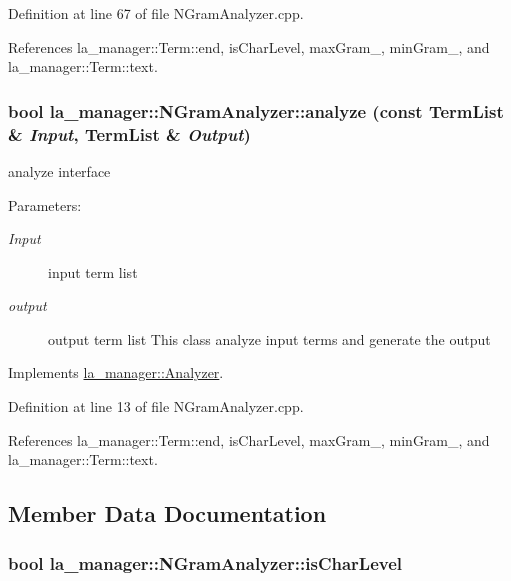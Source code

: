 Definition at line 67 of file NGramAnalyzer.cpp.

References la\_\-manager::Term::end, isCharLevel, maxGram\_\-, minGram\_\-, and la\_\-manager::Term::text.\hypertarget{classla__manager_1_1NGramAnalyzer_09bdd966dba6ac9b3ef4858fd0b24699}{
\subsubsection[{analyze}]{\setlength{\rightskip}{0pt plus 5cm}bool la\_\-manager::NGramAnalyzer::analyze (const {\bf TermList} \& {\em Input}, \/  {\bf TermList} \& {\em Output})}}
\label{classla__manager_1_1NGramAnalyzer_09bdd966dba6ac9b3ef4858fd0b24699}


analyze interface 

\begin{Desc}
\item[Parameters:]
\begin{description}
\item[{\em Input}]input term list \item[{\em output}]output term list This class analyze input terms and generate the output \end{description}
\end{Desc}


Implements \hyperlink{classla__manager_1_1Analyzer_a096ba4b2faeaa0f3938d7b826ab1c78}{la\_\-manager::Analyzer}.

Definition at line 13 of file NGramAnalyzer.cpp.

References la\_\-manager::Term::end, isCharLevel, maxGram\_\-, minGram\_\-, and la\_\-manager::Term::text.

\subsection{Member Data Documentation}
\hypertarget{classla__manager_1_1NGramAnalyzer_658ed8026b730416d1cf6729ae0deb11}{
\subsubsection[{isCharLevel}]{\setlength{\rightskip}{0pt plus 5cm}bool {\bf la\_\-manager::NGramAnalyzer::isCharLevel}}}
\label{classla__manager_1_1NGramAnalyzer_658ed8026b730416d1cf6729ae0deb11}




